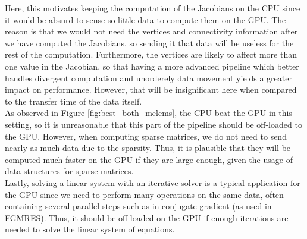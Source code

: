 \documentclass[10pt]{article}
\begin{document}
Here, this motivates keeping the computation of the Jacobians on the CPU since it would be absurd to sense so little data to compute them on the GPU. The reason is that we would not need the vertices and connectivity information after we have computed the Jacobians, so sending it that data will be useless for the rest of the computation. Furthermore, the vertices are likely to affect more than one value in the Jacobian, so that having a more advanced pipeline which better handles divergent computation and unorderely data movement yields a greater impact on performance. However, that will be insignificant here when compared to the transfer time of the data itself. \\

As observed in Figure \ref{fig:best_both_melems}, the CPU beat the GPU in this setting, so it is unreasonable that this part of the pipeline should be off-loaded to the GPU. However, when computing sparse matrices, we do not need to send nearly as much data due to the sparsity. Thus, it is plausible that they will be computed much faster on the GPU if they are large enough, given the usage of data structures for sparse matrices. \\

Lastly, solving a linear system with an iterative solver is a typical application for the GPU since we need to perform many operations on the same data, often containing several parallel steps such as in conjugate gradient (as used in FGMRES). Thus, it should be off-loaded on the GPU if enough iterations are needed to solve the linear system of equations.
\end{document}
